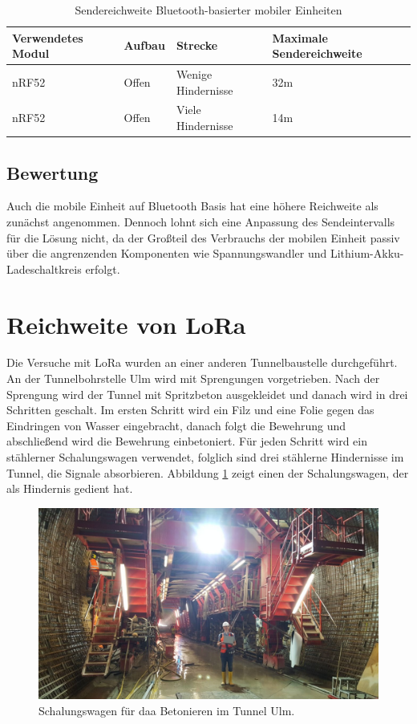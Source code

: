 \begin{table}[h]
	\centering
	\caption{Sendereichweite Bluetooth-basierter mobiler Einheiten}
	\label{table:rangeblue}
	\begin{tabular}{p{3.5cm}|p{3cm}|p{3.5cm}|p{3cm}}
		Verwendetes Modul & Aufbau & Strecke & Maximale Sendereichweite \\
		\hline
		nRF52 & Offen & Wenige Hindernisse & 32m \\
		nRF52 & Offen & Viele Hindernisse & 14m \\
	\end{tabular}
\end{table}

\subsection{Bewertung}
Auch die mobile Einheit auf Bluetooth Basis hat eine höhere Reichweite als zunächst angenommen. 
Dennoch lohnt sich eine Anpassung des Sendeintervalls für die Lösung nicht, da der Großteil des Verbrauchs der mobilen Einheit passiv über die angrenzenden Komponenten wie Spannungswandler und Lithium-Akku-Ladeschaltkreis erfolgt.





\section{Reichweite von LoRa}
Die Versuche mit LoRa wurden an einer anderen Tunnelbaustelle durchgeführt.
An der Tunnelbohrstelle Ulm wird mit Sprengungen vorgetrieben.
Nach der Sprengung wird der Tunnel mit Spritzbeton ausgekleidet und danach wird in drei Schritten geschalt. 
Im ersten Schritt wird ein Filz und eine Folie gegen das Eindringen von Wasser eingebracht, danach folgt die Bewehrung und abschließend wird die Bewehrung einbetoniert.
Für jeden Schritt wird ein stählerner Schalungswagen verwendet, folglich sind drei stählerne Hindernisse im Tunnel, die Signale absorbieren.
Abbildung \ref{fig:schalungswagen} zeigt einen der Schalungswagen, der als Hindernis gedient hat.

\begin{figure}[h]
  \centering
	\includegraphics[width=\textwidth]{images/schalungswagen.jpg}
  \caption{Schalungswagen für daa Betonieren im Tunnel Ulm.}
  \label{fig:schalungswagen}
\end{figure}

